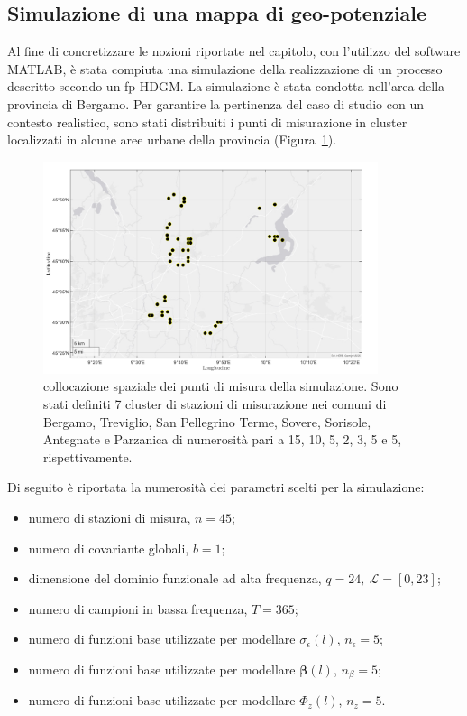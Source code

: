 \subsection[Simulazione di una mappa di geo-potenziale]{Simulazione di una mappa di geo-potenziale}
Al fine di concretizzare le nozioni riportate nel capitolo, con l'utilizzo del software MATLAB, è stata compiuta una simulazione della realizzazione di un processo descritto secondo un fp-HDGM. La simulazione è stata condotta nell'area della provincia di Bergamo. Per garantire la pertinenza del caso di studio con un contesto realistico, sono stati distribuiti i punti di misurazione in cluster localizzati in alcune aree urbane della provincia (Figura~\ref{mappa_stazioni_simulate}). 
\begin{figure}[htpb]
	\centering
	\includegraphics[height=235px]{Immagini/2. Nuovo modello/Mappa stazioni simulate_png}
	\caption[Collocazione spaziale dei punti di misura della simulazione.] {collocazione spaziale dei punti di misura della simulazione. Sono stati definiti 7 cluster di stazioni di misurazione nei comuni di Bergamo, Treviglio, San Pellegrino Terme, Sovere, Sorisole, Antegnate e Parzanica di numerosità pari a \num{15}, \num{10}, \num{5}, \num{2}, \num{3}, \num{5} e \num{5}, rispettivamente.}
	\label{mappa_stazioni_simulate}
\end{figure}
Di seguito è riportata la numerosità dei parametri scelti per la simulazione:
\begin{itemize}
	\item numero di stazioni di misura, $n=45$;
	\item numero di covariante globali, $b=1$;                               
	\item dimensione del dominio funzionale ad alta frequenza, $q=24,\ \mathcal{L}=[0, 23]$;
	\item numero di campioni in bassa frequenza, $T=365$;
	\item numero di funzioni base utilizzate per modellare  $\sigma_\epsilon (l)$,  $n_\epsilon =5$;
	\item numero di funzioni base utilizzate per modellare $\boldsymbol{\beta}(l)$, $n_\beta=5$;
	\item numero di funzioni base utilizzate per modellare $\Phi_z(l)$, $n_z=5$.
\end{itemize}
